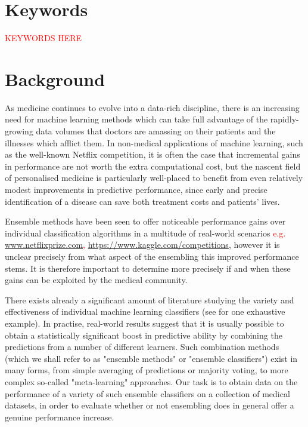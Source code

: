 \documentclass{document}
\begin{document}
\maketitle

\section{Keywords}
\textcolor{red}{KEYWORDS HERE}


\section{Background}
As medicine continues to evolve into a data-rich discipline, there is an increasing need for machine learning methods which can take full advantage of the rapidly-growing data volumes that doctors are amassing on their patients and the illnesses which afflict them. In non-medical applications of machine learning, such as the well-known Netflix competition\textcolor{red}{\cite{netflixprize}}, it is often the case that incremental gains in performance are not worth the extra computational cost, but the nascent  field of personalised medicine is particularly well-placed to benefit from even  relatively modest improvements in  predictive performance, since early  and precise identification of a disease can save both treatment costs and patients' lives. 

Ensemble methods have been seen to offer noticeable performance gains over individual classification algorithms in a multitude of real-world scenarios 
\textcolor{red}{e.g. \url{www.netflixprize.com}, \url{https://www.kaggle.com/competitions}}, 
however it is unclear precisely from what aspect of the ensembling this improved performance stems.  It is therefore important to determine more precisely if and when these gains can be exploited by the medical community.

There exists already a significant amount of literature studying the variety and effectiveness of individual machine learning classifiers (see \cite{classifiercomparison} for one exhaustive example). In practise, real-world results suggest that it is usually possible to obtain a statistically significant boost in predictive ability by combining the predictions from a number of different learners. Such combination methods (which we shall refer to as "ensemble methods" or "ensemble classifiers") exist in many forms, from simple averaging of predictions or majority voting, to more complex so-called "meta-learning" approaches. Our task is to obtain data on the performance of a variety of such ensemble classifiers on a collection of medical datasets, in order to evaluate whether or not ensembling does in general offer a genuine performance increase.
\end{document}
